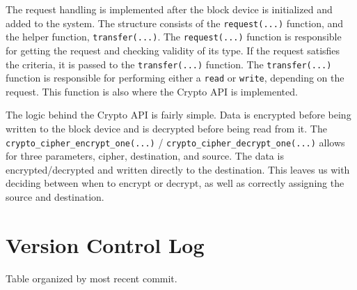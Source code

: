 \documentclass[letterpaper,10pt,onecolumn]{IEEEtran}
\begin{document}
        The request handling is implemented after the block device is initialized and added to the system. The structure consists of the \texttt{request(...)} function, and the helper function, \texttt{transfer(...)}. The \texttt{request(...)} function is responsible for getting the request and checking validity of its type. If the request satisfies the criteria, it is passed to the \texttt{transfer(...)} function. The \texttt{transfer(...)} function is responsible for performing either a \texttt{read} or \texttt{write}, depending on the request. This function is also where the Crypto API is implemented.
        
        The logic behind the Crypto API is fairly simple. Data is encrypted before being written to the block device and is decrypted before being read from it. The \texttt{crypto\_cipher\_encrypt\_one(...)} / \texttt{crypto\_cipher\_decrypt\_one(...)} allows for three parameters, cipher, destination, and source. The data is encrypted/decrypted and written directly to the destination. This leaves us with deciding between when to encrypt or decrypt, as well as correctly assigning the source and destination. 

    \vspace{6mm}
    
    
    \section*{Version Control Log}
        \begin{center}
            Table organized by most recent commit.
        \end{center}
        
        \vspace{0.5mm}
        
\end{document}
